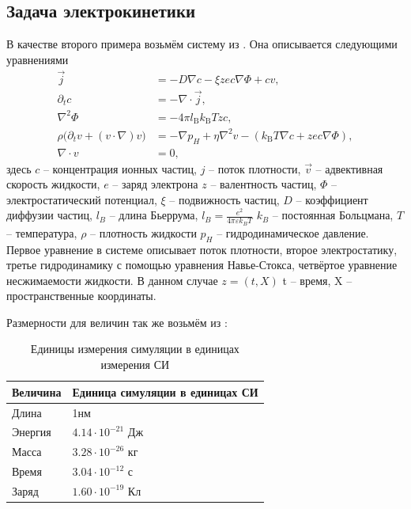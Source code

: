 \documentclass[a4paper,14pt]{extarticle} %
\def\oldcite{} \let\oldcite=\cite
\def\cite{\stepcounter{citesnum}\oldcite}
\begin{document}
\FloatBarrier
\subsection{Задача электрокинетики}

В качестве второго примера возьмём систему из \cite{bib:tutor}. Она описывается следующими уравнениями
\begin{equation}\label{eq:ek_eq}
    \begin{aligned}
        \vec{j}                                             & =
        -D \nabla c - \xi z e c \nabla \Phi + c v,                                    \\
        \partial_{t} c                                      & =
        -\nabla \cdot\vec{j},                                                         \\
        \nabla^2 \Phi                                       & =
        -4 \pi l_\mathrm{B} k_\mathrm{B}T z c,                                        \\
        \rho \big( \partial_t v + (v \cdot \nabla ) v \big) & =
        -\nabla p_H + \eta \nabla^{2} v - (k_\mathrm{B}T \nabla c + zec \nabla \Phi), \\
        \nabla \cdot v                                      & =
        0,
    \end{aligned}
\end{equation}
здесь $c$ -- концентрация ионных частиц, $j$ -- поток плотности, $\vec{v}$ -- адвективная скорость жидкости, $e$ -- заряд электрона $z$ -- валентность частиц, $\Phi$ -- электростатический потенциал, $\xi$ -- подвижность частиц, $D$ -- коэффициент диффузии частиц, $l_B$ -- длина Бьеррума, $l_B = \frac{e^2}{4\pi\varepsilon k_B T}$ $k_B$ -- постоянная Больцмана, $T$ -- температура, $\rho$ -- плотность жидкости $p_H$ -- гидродинамическое давление. Первое уравнение в системе описывает поток плотности, второе электростатику, третье гидродинамику с помощью уравнения Навье-Стокса, четвёртое уравнение несжимаемости жидкости. В данном случае $z = (t, X)$ t -- время, X -- пространственные координаты.

Размерности для величин так же возьмём из \cite{bib:tutor}:

\begin{table}[H]
    \center
    \begin{tabular}{|l|l|}
        \hline
        Величина & Единица симуляции в единицах СИ \\
        \hline
        Длина    & 1нм                             \\
        \hline
        Энергия  & $4.14\cdot 10^{-21}$ Дж         \\
        \hline
        Масса    & $3.28 \cdot 10^{-26}$ кг        \\
        \hline
        Время    & $3.04 \cdot 10^{-12}$ с         \\
        \hline
        Заряд    & $1.60 \cdot 10^{-19}$ Кл        \\
        \hline
    \end{tabular}
    \caption{Единицы измерения симуляции в единицах измерения СИ}
\end{table}
\end{document}
